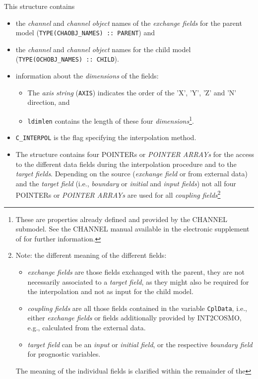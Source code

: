 \documentclass[11pt,twoside]{article}
\begin{document}
This structure contains 
\begin{itemize}
\item the {\it channel} and {\it channel object} names of the 
{\it exchange fields} for the parent model (\verb|TYPE(CHAOBJ_NAMES) :: PARENT|) and
\item   the {\it channel} and {\it channel object} names
for the child model (\verb|TYPE(OCHOBJ_NAMES) :: CHILD|). 
\item information about the {\it dimensions} of the fields:
\begin{itemize}
\item The {\it axis string} (\verb|AXIS|) 
indicates the order of the 'X', 'Y', 'Z' and 'N' direction, and 
\item \verb|ldimlen| contains the length of these four 
{\it dimensions}\footnote{These are
properties already defined and provided by the CHANNEL submodel. See the CHANNEL
manual available in the electronic supplement of \cite{Joeckel10a} for further
information.}.
\end{itemize}
\item \verb|C_INTERPOL| is the flag specifying the
interpolation method. 
\item The structure contains four {\footnotesize POINTERs} or 
{\footnotesize \it POINTER ARRAYs} for the access to the different data fields 
during
the interpolation procedure and to the {\it target fields}. Depending on the
source ({\it exchange field} or from external data) and the {\it target field}
(i.e., {\it boundary} or {\it initial} and {\it input fields}) not all four
{\footnotesize POINTERs} or {\footnotesize \it POINTER ARRAYs} are used for all
{\it coupling fields}\footnote{Note: the different meaning of the different 
fields: \begin{itemize}
\item {\it exchange fields} are those fields exchanged with the parent, they 
are not necessarily associated to a {\it target field}, as they might also be
required for the interpolation and not as input for the child model.
\item {\it coupling fields} are all those fields contained in the variable 
{\tt CplData}, i.e., either {\it exchange fields} or fields additionally provided
by INT2COSMO, e.g., calculated from the external data.
\item {\it target field} can be an {\it input} or 
{\it initial field}, or the respective {\it boundary field} for prognostic 
variables.
\end{itemize} 
The meaning of the individual fields is clarified within the remainder of the 
}
\end{itemize}
\end{document}
